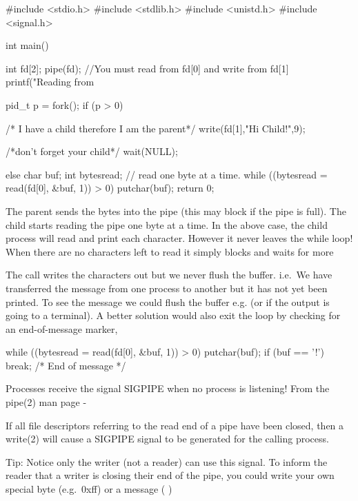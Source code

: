 \begin{enumerate}
\begin{code}[language=C]
#include <stdio.h>
#include <stdlib.h>
#include <unistd.h>
#include <signal.h>

int main() {
    int fd[2];
    pipe(fd);
    //You must read from fd[0] and write from fd[1]
    printf("Reading from %

    pid_t p = fork();
    if (p > 0) {
        /* I have a child therefore I am the parent*/
        write(fd[1],"Hi Child!",9);

        /*don't forget your child*/
        wait(NULL);
    } else {
        char buf;
        int bytesread;
        // read one byte at a time.
        while ((bytesread = read(fd[0], &buf, 1)) > 0) {
            putchar(buf);
        }
    }
    return 0;
}
\end{code}

The parent sends the bytes  into the pipe (this may block if the pipe is full). The child starts reading the pipe one byte at a time. In the above case, the child process will read and print each character. However it never leaves the while loop! When there are no characters left to read it simply blocks and waits for more 

The call  writes the characters out but we never flush the  buffer. i.e.~We have transferred the message from one process to another but it has not yet been printed. To see the message we could flush the buffer e.g.  (or  if the output is going to a terminal). A better solution would also exit the loop by checking for an end-of-message marker,

\begin{code}[language=C]
        while ((bytesread = read(fd[0], &buf, 1)) > 0) {
            putchar(buf);
            if (buf == '!') break; /* End of message */
        }
\end{code}

Processes receive the signal SIGPIPE when no process is listening! From
the pipe(2) man page -

\begin{code}[language=C]
If all file descriptors referring to the read end of a pipe have been closed,
 then a write(2) will cause a SIGPIPE signal to be generated for the calling process. 
\end{code}

Tip: Notice only the writer (not a reader) can use this signal. To
inform the reader that a writer is closing their end of the pipe, you
could write your own special byte (e.g.~0xff) or a message (
)


\end{enumerate}
